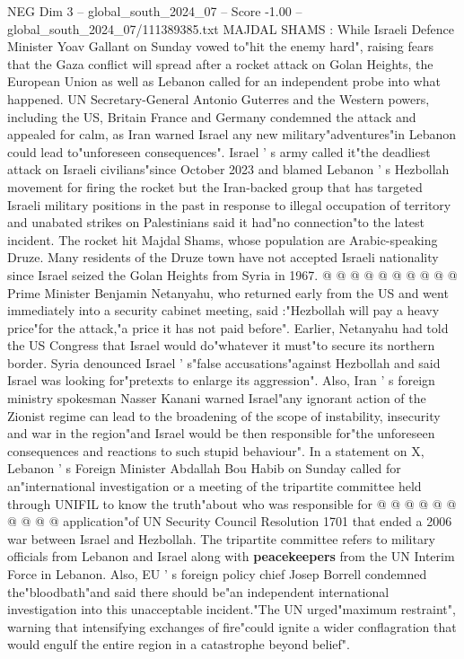 \begin{textsample}{NEG Dim 3 – global\_south\_2024\_07 – Score -1.00 – global\_south\_2024\_07/111389385.txt}  \label{ex:f3_neg_143}
MAJDAL SHAMS : While Israeli Defence Minister Yoav Gallant on Sunday vowed to"hit the enemy hard", raising fears that the Gaza conflict will spread after a rocket attack on Golan Heights, the European Union as well as Lebanon called for an independent probe into what happened.
UN Secretary-General Antonio Guterres and the Western powers, including the US, Britain France and Germany condemned the attack and appealed for calm, as Iran warned Israel any new military"adventures"in Lebanon could lead to"unforeseen consequences".
Israel ' s army called it"the deadliest attack on Israeli civilians"since October 2023 and blamed Lebanon ' s Hezbollah movement for firing the rocket but the Iran-backed group that has targeted Israeli military positions in the past in response to illegal occupation of territory and unabated strikes on Palestinians said it had"no connection"to the latest incident.
The rocket hit Majdal Shams, whose population are Arabic-speaking Druze.
Many residents of the Druze town have not accepted Israeli nationality since Israel seized the Golan Heights from Syria in 1967. @ @ @ @ @ @ @ @ @ @ Prime Minister Benjamin Netanyahu, who returned early from the US and went immediately into a security cabinet meeting, said :"Hezbollah will pay a heavy price"for the attack,"a price it has not paid before".
Earlier, Netanyahu had told the US Congress that Israel would do"whatever it must"to secure its northern border.
Syria denounced Israel ' s"false accusations"against Hezbollah and said Israel was looking for"pretexts to enlarge its aggression".
Also, Iran ' s foreign ministry spokesman Nasser Kanani warned Israel"any ignorant action of the Zionist regime can lead to the broadening of the scope of instability, insecurity and war in the region"and Israel would be then responsible for"the unforeseen consequences and reactions to such stupid behaviour".
In a statement on X, Lebanon ' s Foreign Minister Abdallah Bou Habib on Sunday called for an"international investigation or a meeting of the tripartite committee held through UNIFIL to know the truth"about who was responsible for @ @ @ @ @ @ @ @ @ @ application"of UN Security Council Resolution 1701 that ended a 2006 war between Israel and Hezbollah.
The tripartite committee refers to military officials from Lebanon and Israel along with \textbf{peacekeepers} from the UN Interim Force in Lebanon.
Also, EU ' s foreign policy chief Josep Borrell condemned the"bloodbath"and said there should be"an independent international investigation into this unacceptable incident."The UN urged"maximum restraint", warning that intensifying exchanges of fire"could ignite a wider conflagration that would engulf the entire region in a catastrophe beyond belief".

\end{textsample}
